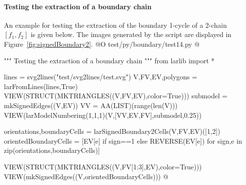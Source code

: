 \documentclass[11pt,oneside]{article}    %
\begin{document}
\paragraph{Testing the extraction of a boundary chain}
An example for testing the extraction of the boundary 1-cycle of a 2-chain $[f_1,f_2]$ is given below.
The images generated by the script are displayed in Figure~\ref{fig:signedBoundary2}.
@O test/py/boundary/test14.py
@{""" Testing the extraction of a boundary chain """
from larlib import *

lines = svg2lines("test/svg2lines/test.svg")
V,FV,EV,polygons = larFromLines(lines,True)
VIEW(STRUCT(MKTRIANGLES((V,FV,EV),color=True)))
submodel = mkSignedEdges((V,EV))
VV = AA(LIST)(range(len(V)))
VIEW(larModelNumbering(1,1,1)(V,[VV,EV,FV],submodel,0.25))

orientations,boundaryCells = larSignedBoundary2Cells(V,FV,EV)([1,2])
orientedBoundaryCells = [EV[e] if sign==1 else REVERSE(EV[e]) 
						for sign,e in zip(orientations,boundaryCells)]

VIEW(STRUCT(MKTRIANGLES((V,FV[1:3],EV),color=True)))
VIEW(mkSignedEdges((V,orientedBoundaryCells)))
@}
\end{document}
